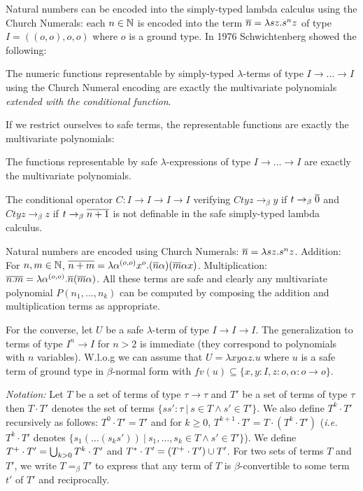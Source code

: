 Natural numbers can be encoded into the simply-typed
lambda calculus using the Church Numerals: each $n\in\mathbb{N}$ is
encoded into the term $\overline{n} = \lambda s z. s^n z$ of type $I =
((o,o),o,o)$ where $o$ is a ground type. In 1976 Schwichtenberg
\cite{citeulike:622637} showed the following:


\begin{theorem}[Schwichtenberg 1976]
The numeric functions representable by simply-typed $\lambda$-terms of
type $I\rightarrow \ldots \rightarrow I$ using the Church Numeral
encoding are exactly the multivariate polynomials \emph{extended with
the conditional function}.
\end{theorem}

If we restrict ourselves to safe terms, the representable functions are
exactly the multivariate polynomials:
\begin{theorem}
\label{thm:polychar}
The functions representable by safe $\lambda$-expressions of type
$I\rightarrow \ldots \rightarrow I$ are exactly the multivariate
polynomials.
\end{theorem}

\begin{corollary}
The conditional operator $C:I\rightarrow I\rightarrow I \rightarrow I$ verifying  $C t y z \rightarrow_\beta y$  if $t \rightarrow_\beta \overline{0}$ and $C t y z \rightarrow_\beta z$ if $t \rightarrow_\beta \overline{n+1}$ is not definable in the safe simply-typed lambda calculus.
\end{corollary}
\proof
  Natural numbers are encoded using Church Numerals: $\overline{n} =
  \lambda s z. s^n z$.  Addition: For $n,m \in \mathbb{N}$, $\overline{n+m} =
  \lambda \alpha^{(o,o)} x^o . (\overline{n} \alpha) (\overline{m} \alpha
  x)$. Multiplication: $\overline{n . m} = \lambda \alpha^{(o,o)}
  . \overline{n} (\overline{m} \alpha)$.  All these terms are safe and
  clearly any multivariate polynomial $P(n_1, \ldots, n_k)$ can be
  computed by composing the addition and multiplication terms as
  appropriate.

For the converse, let $U$ be a safe $\lambda$-term of type
$I\rightarrow I\rightarrow I$.  The generalization to terms of type
$I^n \rightarrow I$ for $n>2$ is immediate (they correspond to
polynomials with $n$ variables). W.l.o.g we can
assume that $U = \lambda x y \alpha z. u$ where $u$ is a safe term of
ground type in $\beta$-normal form with $fv(u) \subseteq \{ x, y : I,
z :o, \alpha : o\rightarrow o \}$.

\emph{Notation:} Let $T$ be a set of terms of type $\tau \rightarrow \tau$ and $T'$ be a set of terms of type $\tau$ then $T \cdot T'$ denotes the set of terms $\{ s s' : \tau \ | \ s \in T \wedge s' \in T' \}$. We also define
$T^k \cdot T'$ recursively as follows:  $T^0 \cdot T' = T'$ and
for $k\geq 0$, $T^{k+1} \cdot T' = T \cdot (T^k \cdot T')$ ({\it i.e.}~$T^k \cdot T'$ denotes $\{ s_1( \ldots (s_k s'))  \ | \ s_1, \ldots, s_k \in T \wedge s' \in T' \}$). We define $T^+\cdot T' = \bigcup_{k > 0} T^k \cdot T'$ and
$T^*\cdot T' = (T^+\cdot T') \cup T'$.
For two sets of terms $T$ and $T'$, we write $T =_\beta T'$ to express that any term of $T$ is $\beta$-convertible to some term $t'$ of $T'$ and reciprocally.

